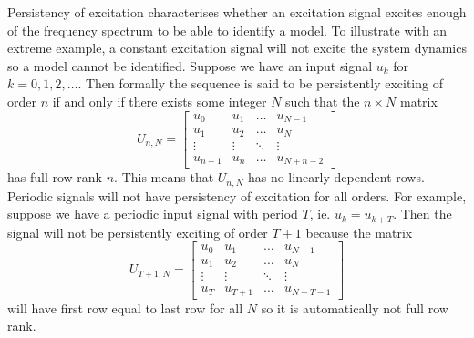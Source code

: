 \documentclass[11pt]{report} %
\begin{document}
Persistency of excitation characterises whether an excitation signal excites enough of the frequency spectrum to be able to identify a model. To illustrate with an extreme example, a constant excitation signal will not excite the system dynamics so a model cannot be identified. Suppose we have an input signal $u_{k}$ for $k = 0, 1, 2, \dots$. Then formally the sequence is said to be persistently exciting of order $n$ if and only if there exists some integer $N$ such that the $n\times N$ matrix
\begin{equation}
U_{n, N} = \begin{bmatrix}u_{0} & u_{1} & \dots & u_{N-1}\\
u_{1} & u_{2} & \dots & u_{N}\\
\vdots & \vdots & \ddots & \vdots\\
u_{n-1} & u_{n} & \dots & u_{N+n-2}
\end{bmatrix}
\end{equation}
has full row rank $n$. This means that $U_{n, N}$ has no linearly dependent rows. Periodic signals will not have persistency of excitation for all orders. For example, suppose we have a periodic input signal with period $T$, ie. $u_{k} = u_{k + T}$. Then the signal will not be persistently exciting of order $T + 1$ because the matrix
\begin{equation}
U_{T + 1, N} = \begin{bmatrix}u_{0} & u_{1} & \dots & u_{N-1}\\
u_{1} & u_{2} & \dots & u_{N}\\
\vdots & \vdots & \ddots & \vdots\\
u_{T} & u_{T+1} & \dots & u_{N+T-1}
\end{bmatrix}
\end{equation}
will have first row equal to last row for all $N$ so it is automatically not full row rank. \\
\end{document}
